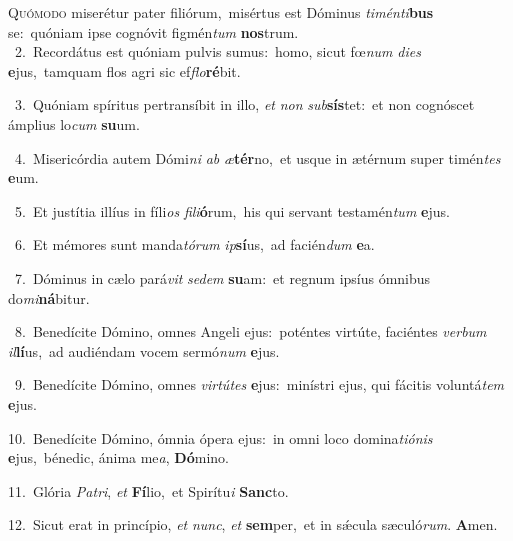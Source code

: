 \lettrine{\initial\textcolor{\initialcolor}{Q}}{uómodo} miserétur pater filiórum,~\dagger misértus est Dóminus \textit{ti}\-\textit{mén}\textit{ti}\textbf{bus} se:~\star quóniam ipse cognóvit figmén\textit{tum} \textbf{nos}\-trum.\\
{\numbfont\textcolor{\numbcolor}{~2.}}~Recordátus est quóniam pulvis sumus:~\dagger homo, sicut fœ\textit{num} \textit{di}\-\textit{es} \textbf{e}\-jus,~\star tamquam flos agri sic ef\-\textit{flo}\-\textbf{ré}bit.\par
{\numbfont\textcolor{\numbcolor}{~3.}}~Quóniam spíritus pertransíbit in illo, \textit{et} \textit{non} \textit{sub}\-\textbf{sís}tet:~\star et non cognóscet ámplius lo\textit{cum} \textbf{su}\-um.\par
{\numbfont\textcolor{\numbcolor}{~4.}}~Misericórdia autem Dómi\textit{ni} \textit{ab} \textit{æ}\-\textbf{tér}no,~\star et usque in ætérnum super timén\textit{tes} \textbf{e}\-um.\par
{\numbfont\textcolor{\numbcolor}{~5.}}~Et justítia illíus in fíli\textit{os} \textit{fi}\-\textit{li}\textbf{ó}rum,~\star his qui servant testamén\textit{tum} \textbf{e}\-jus.\par
{\numbfont\textcolor{\numbcolor}{~6.}}~Et mémores sunt manda\-\textit{tó}\-\textit{rum} \textit{ip}\-\textbf{sí}us,~\star ad facién\textit{dum} \textbf{e}\-a.\par
{\numbfont\textcolor{\numbcolor}{~7.}}~Dóminus in cælo pará\textit{vit} \textit{se}\-\textit{dem} \textbf{su}\-am:~\star et regnum ipsíus ómnibus do\-\textit{mi}\-\textbf{ná}bitur.\par
{\numbfont\textcolor{\numbcolor}{~8.}}~Benedícite Dómino, omnes Angeli ejus:~\dagger poténtes virtúte, faciéntes \textit{ver}\-\textit{bum} \textit{il}\-\textbf{lí}us,~\star ad audiéndam vocem sermó\textit{num} \textbf{e}\-jus.\par
{\numbfont\textcolor{\numbcolor}{~9.}}~Benedícite Dómino, omnes \textit{vir}\-\textit{tú}\textit{tes} \textbf{e}\-jus:~\star minístri ejus, qui fácitis voluntá\textit{tem} \textbf{e}\-jus.\par
{\numbfont\textcolor{\numbcolor}{10.}}~Benedícite Dómino, ómnia ópera ejus:~\dagger in omni loco domina\-\textit{ti}\-\textit{ó}\textit{nis} \textbf{e}\-jus,~\star bénedic, ánima me\-\textit{a}\-, \textbf{Dó}\-mino.\par
{\numbfont\textcolor{\numbcolor}{11.}}~Glória \textit{Pa}\-\textit{tri}, \textit{et} \textbf{Fí}\-lio,~\star et Spirítu\textit{i} \textbf{Sanc}\-to.\par
{\numbfont\textcolor{\numbcolor}{12.}}~Sicut erat in princípio, \textit{et} \textit{nunc}\-, \textit{et} \textbf{sem}\-per,~\star et in sǽcula sæculó\-\textit{rum}\-. \textbf{A}\-men.\par
